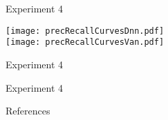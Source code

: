 \documentclass[mathserif, 14pt, xcolor=svgnames]{beamer}
\begin{document}
\bgroup
\begin{frame}{Experiment 4}
  \begin{center}
    \texttt{[image: precRecallCurvesDnn.pdf]} \\
    \texttt{[image: precRecallCurvesVan.pdf]}
  \end{center}
\end{frame}
\egroup

\bgroup
\begin{frame}{Experiment 4}
  \begin{table}
        \caption{mean Average Precision for Various Tracker Implementations}
  \end{table}
\end{frame}
\egroup

\bgroup
\begin{frame}{Experiment 4}
  \begin{center}
  \end{center}
\end{frame}
\egroup

\begin{frame}{References}
    
    \fontsize{6pt}{6pt}\selectfont
\end{frame}
\end{document}
